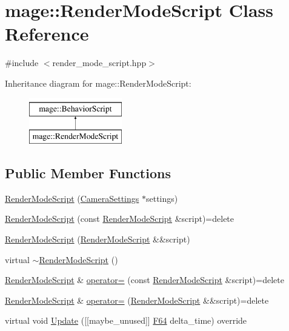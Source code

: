 \hypertarget{classmage_1_1_render_mode_script}{}\section{mage\+:\+:Render\+Mode\+Script Class Reference}
\label{classmage_1_1_render_mode_script}


{\ttfamily \#include $<$render\+\_\+mode\+\_\+script.\+hpp$>$}

Inheritance diagram for mage\+:\+:Render\+Mode\+Script\+:\begin{figure}[H]
\begin{center}
\leavevmode
\includegraphics[height=2.000000cm]{classmage_1_1_render_mode_script}
\end{center}
\end{figure}
\subsection*{Public Member Functions}
\begin{DoxyCompactItemize}
\item 
\hyperlink{classmage_1_1_render_mode_script_a313a1819a7d769199fe19a0573761e31}{Render\+Mode\+Script} (\hyperlink{classmage_1_1_camera_settings}{Camera\+Settings} $\ast$settings)
\item 
\hyperlink{classmage_1_1_render_mode_script_ac6b9d813ff57646b4bdcded5f1efdfb1}{Render\+Mode\+Script} (const \hyperlink{classmage_1_1_render_mode_script}{Render\+Mode\+Script} \&script)=delete
\item 
\hyperlink{classmage_1_1_render_mode_script_aafc57a9e0066734f91db798577ee3edb}{Render\+Mode\+Script} (\hyperlink{classmage_1_1_render_mode_script}{Render\+Mode\+Script} \&\&script)
\item 
virtual \hyperlink{classmage_1_1_render_mode_script_a9fac374686ee177e8272b4b7ea8f83a3}{$\sim$\+Render\+Mode\+Script} ()
\item 
\hyperlink{classmage_1_1_render_mode_script}{Render\+Mode\+Script} \& \hyperlink{classmage_1_1_render_mode_script_a0b81f5f341f48954e18b1a81c36a0263}{operator=} (const \hyperlink{classmage_1_1_render_mode_script}{Render\+Mode\+Script} \&script)=delete
\item 
\hyperlink{classmage_1_1_render_mode_script}{Render\+Mode\+Script} \& \hyperlink{classmage_1_1_render_mode_script_a8ca48ab27bef55314b1a822b827153b2}{operator=} (\hyperlink{classmage_1_1_render_mode_script}{Render\+Mode\+Script} \&\&script)=delete
\item 
virtual void \hyperlink{classmage_1_1_render_mode_script_af40eef8ffcb392f408ebfa3f5801354a}{Update} (\mbox{[}\mbox{[}maybe\+\_\+unused\mbox{]}\mbox{]} \hyperlink{namespacemage_ad26233bbec640deda836e572c1a23708}{F64} delta\+\_\+time) override
\end{DoxyCompactItemize}
